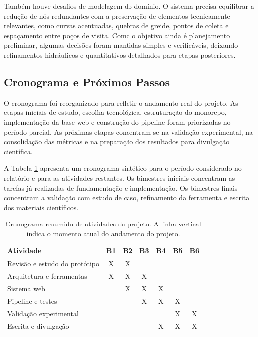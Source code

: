 \documentclass[12pt,a4paper]{article}
\begin{document}
Também houve desafios de modelagem do domínio. O sistema precisa equilibrar a redução de nós redundantes com a preservação de elementos tecnicamente relevantes, como curvas acentuadas, quebras de greide, pontos de coleta e espaçamento entre poços de visita. Como o objetivo ainda é planejamento preliminar, algumas decisões foram mantidas simples e verificáveis, deixando refinamentos hidráulicos e quantitativos detalhados para etapas posteriores.

\subsection{Cronograma e Próximos Passos}

O cronograma foi reorganizado para refletir o andamento real do projeto. As etapas iniciais de estudo, escolha tecnológica, estruturação do monorepo, implementação da base web e construção do pipeline foram priorizadas no período parcial.
As próximas etapas concentram-se na validação experimental, na consolidação das métricas e na preparação dos resultados para divulgação científica.

A Tabela \ref{sec:cronograma} apresenta um cronograma sintético para o período considerado no relatório e para as atividades restantes. Os bimestres iniciais concentram as tarefas já realizadas de fundamentação e implementação. Os bimestres finais concentram a validação com estudo de caso, refinamento da ferramenta e escrita dos materiais científicos.

\begin{table}[H]
    \centering
    \caption{Cronograma resumido de atividades do projeto. A linha vertical indica o momento atual do andamento do projeto.}\label{sec:cronograma}
    \begin{tabular}{lccc|ccc}
        \toprule
        Atividade & B1 & B2 & B3 & B4 & B5 & B6 \\
        \midrule
        Revisão e estudo do protótipo & X & X &   &   &   &   \\
        Arquitetura e ferramentas     & X & X & X &   &   &   \\
        Sistema web                   &   & X & X & X &   &   \\
        Pipeline e testes             &   &   & X & X & X &   \\
        Validação experimental        &   &   &   &   & X & X \\
        Escrita e divulgação          &   &   &   & X & X & X \\
        \bottomrule
    \end{tabular}
\end{table}
\end{document}

